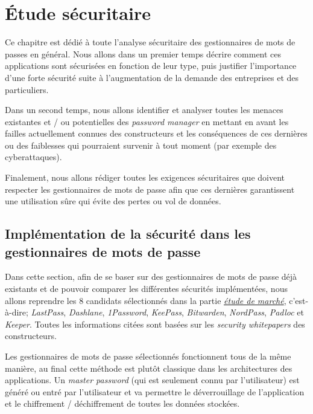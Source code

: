 
\chapter{Étude sécuritaire}
\label{ch:etude_secu}

Ce chapitre est dédié à toute l'analyse sécuritaire des gestionnaires de mots de passes en général. Nous allons dans un premier temps décrire comment ces applications sont sécurisées en fonction de leur type, puis justifier l'importance d'une forte sécurité suite à l'augmentation de la demande des entreprises et des particuliers.

Dans un second temps, nous allons identifier et analyser toutes les menaces existantes et / ou potentielles des \textit{password manager} en mettant en avant les failles actuellement connues des constructeurs et les conséquences de ces dernières ou des faiblesses qui pourraient survenir à tout moment (par exemple des cyberattaques).

Finalement, nous allons rédiger toutes les exigences sécuritaires que doivent respecter les gestionnaires de mots de passe afin que ces dernières garantissent une utilisation sûre qui évite des pertes ou vol de données.

\section{Implémentation de la sécurité dans les gestionnaires de mots de passe}

Dans cette section, afin de se baser sur des gestionnaires de mots de passe déjà existants et de pouvoir comparer les différentes sécurités implémentées, nous allons reprendre les 8 candidats sélectionnés dans la partie \hyperref[ch:etude_marche]{\textit{étude de marché}}, c'est-à-dire; \textit{LastPass}, \textit{Dashlane}, \textit{1Password}, \textit{KeePass}, \textit{Bitwarden}, \textit{NordPass}, \textit{Padloc} et \textit{Keeper}. Toutes les informations citées sont basées sur les \textit{security whitepapers} des constructeurs\cite{lastpasssecurity}\cite{dashlanesecurity}\cite{1passwordsecurity}\cite{keepasssecurity}\cite{bitwardensecurity}\cite{padlocsecurity}\cite{keepersecurity}.

Les gestionnaires de mots de passe sélectionnés fonctionnent tous de la même manière, au final cette méthode est plutôt classique dans les architectures des applications. Un \textit{master password} (qui est seulement connu par l'utilisateur) est généré ou entré par l'utilisateur et va permettre le déverrouillage de l'application et le chiffrement / déchiffrement de toutes les données stockées. 

